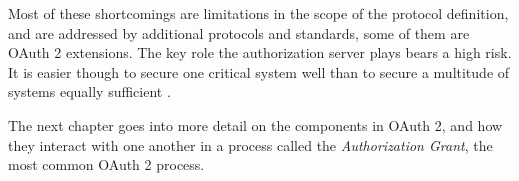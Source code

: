 Most of these shortcomings are limitations in the scope of the protocol definition, and are addressed by additional protocols and standards, some of them are OAuth 2 extensions. The key role the authorization server plays bears a high risk. It is easier though to secure one critical system well than to secure a multitude of systems equally sufficient \cite[p. 18-20]{oauth2-in-action}.

\vskip 13pt

The next chapter goes into more detail on the components in OAuth 2, and how they interact with one another in a process called the \textit{Authorization Grant}, the most common OAuth 2 process.
